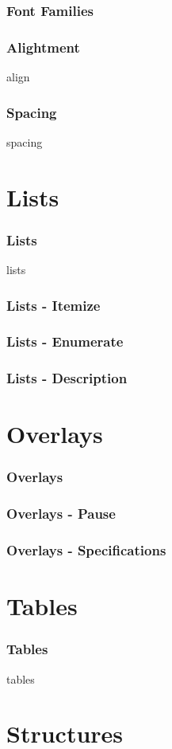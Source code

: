 \documentclass[aspectratio=169,utf8]{ctexbeamer}
\begin{document}
\begin{frame}
  \frametitle{Font Families}
  
\end{frame}

\begin{frame}
  \frametitle{Alightment}
  align
\end{frame}

\begin{frame}
  \frametitle{Spacing}
  spacing
\end{frame}


\section{Lists}
\begin{frame}
  \frametitle{Lists}
  lists
\end{frame}

\begin{frame}
  \frametitle{Lists - Itemize}
\end{frame}

\begin{frame}
  \frametitle{Lists - Enumerate}

  
\end{frame}

\begin{frame}
  \frametitle{Lists - Description}
\end{frame}


\section{Overlays}
\begin{frame}
  \frametitle{Overlays}
\end{frame}

\begin{frame}
  \frametitle{Overlays - Pause}
\end{frame}

\begin{frame}
  \frametitle{Overlays - Specifications}
\end{frame}

\section{Tables}
\begin{frame}
  \frametitle{Tables}
  tables
\end{frame}

\section{Structures}
\end{document}
